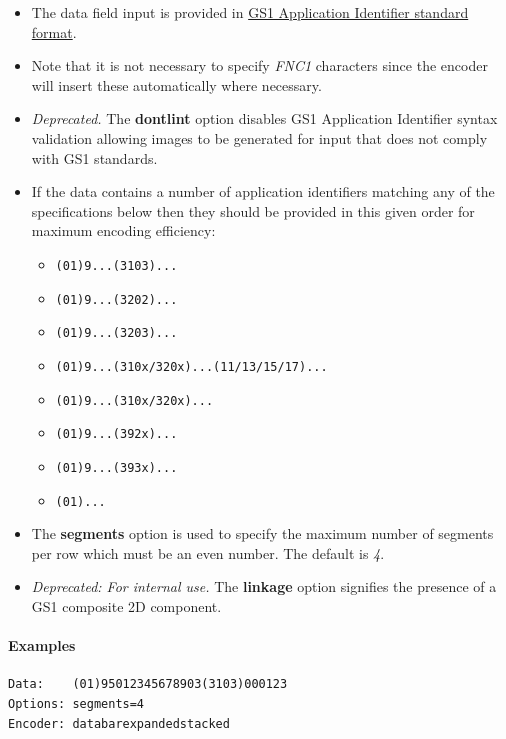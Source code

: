 \begin{itemize}
\tightlist
\item
  The data field input is provided in
  \protect\hyperlink{gs1-application-identifier-standard-format}{GS1
  Application Identifier standard format}.
\item
  Note that it is not necessary to specify \emph{FNC1} characters since
  the encoder will insert these automatically where necessary.
\item
  \emph{Deprecated.} The \textbf{dontlint} option disables GS1
  Application Identifier syntax validation allowing images to be
  generated for input that does not comply with GS1 standards.
\item
  If the data contains a number of application identifiers matching any
  of the specifications below then they should be provided in this given
  order for maximum encoding efficiency:

  \begin{itemize}
  \tightlist
  \item
    \texttt{(01)9...(3103)...}
  \item
    \texttt{(01)9...(3202)...}
  \item
    \texttt{(01)9...(3203)...}
  \item
    \texttt{(01)9...(310x/320x)...(11/13/15/17)...}
  \item
    \texttt{(01)9...(310x/320x)...}
  \item
    \texttt{(01)9...(392x)...}
  \item
    \texttt{(01)9...(393x)...}
  \item
    \texttt{(01)...}
  \end{itemize}
\item
  The \textbf{segments} option is used to specify the maximum number of
  segments per row which must be an even number. The default is
  \emph{4}.
\item
  \emph{Deprecated: For internal use.} The \textbf{linkage} option
  signifies the presence of a GS1 composite 2D component.
\end{itemize}

\hypertarget{examples-27}{%
\paragraph{Examples}\label{examples-27}}

\begin{verbatim}
Data:    (01)95012345678903(3103)000123
Options: segments=4
Encoder: databarexpandedstacked
\end{verbatim}

